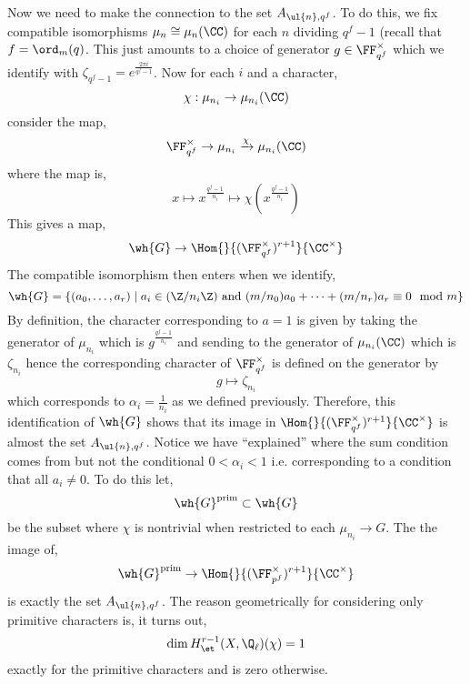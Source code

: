 \documentclass[12pt]{article}
\begin{document}
\bigskip\\
Now we need to make the connection to the set $A_{\ul{n}, q^f}$. To do this, we fix compatible isomorphisms $\mu_n \cong \mu_n(\CC)$ for each $n$ dividing $q^f - 1$ (recall that $f = \ord_m(q)$. This just amounts to a choice of generator $g \in \FF_{q^f}^\times$ which we identify with $\zeta_{q^f-1} = e^{\frac{2 \pi i}{q^f - 1}}$. Now for each $i$ and a character,
\[ \chi : \mu_{n_i} \to \mu_{n_i}(\CC) \]
consider the map,
\[ \FF_{q^f}^\times \to \mu_{n_i} \xrightarrow{\chi} \mu_{n_i}(\CC) \]
where the map is,
\[ x \mapsto x^{\frac{q^f - 1}{n_i}} \mapsto \chi(x^{\frac{q^f - 1}{n_i}}) \]
This gives a map,
\[ \wh{G} \to \Hom{}{(\FF_{q^f}^\times)^{r+1}}{\CC^\times} \]
The compatible isomorphism then enters when we identify,
\[ \wh{G} = \{ (a_0, \dots, a_r) \mid a_i \in (\Z / n_i \Z) \text{ and } (m/n_0) a_0 + \cdots + (m/n_r) a_r \equiv 0 \mod m \} \]
By definition, the character corresponding to $a = 1$ is given by taking the generator of $\mu_{n_i}$ which is $g^{\frac{q^f - 1}{n_i}}$ and sending to the generator of $\mu_{n_i}(\CC)$ which is $\zeta_{n_i}$ hence the corresponding character of $\FF_{q^f}^\times$ is defined on the generator by
\[ g \mapsto \zeta_{n_i} \]
which corresponds to $\alpha_i = \frac{1}{n_i}$ as we defined previously. Therefore, this identification of $\wh{G}$ shows that its image in $\Hom{}{(\FF_{q^f}^\times)^{r+1}}{\CC^\times}$ is almost the set $A_{\ul{n},q^f}$. Notice we have ``explained'' where the sum condition comes from but not the conditional $0 < \alpha_i < 1$ i.e. corresponding to a condition that all $a_i \neq 0$. To do this let,
\[ \wh{G}^{\text{prim}} \subset \wh{G} \]
be the subset where $\chi$ is nontrivial when restricted to each $\mu_{n_i} \to G$. The the image of,
\[ \wh{G}^{\text{prim}} \to \Hom{}{(\FF_{p^f}^\times)^{r+1}}{\CC^\times} \]
is exactly the set $A_{\ul{n}, q^f}$. The reason geometrically for considering only primitive characters is, it turns out, 
\[ \dim H^{r-1}_{\et}(X, \Q_\ell)(\chi) = 1 \]
exactly for the primitive characters and is zero otherwise. 
\end{document}
